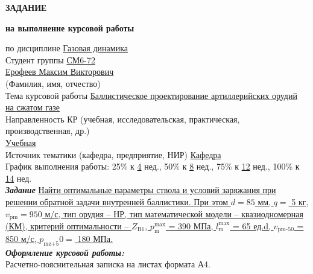 \documentclass[14pt, a4paper]{extarticle} %
\newcommand{\und}[1]{\uline{#1}}
\begin{document}
\begin{titlepage}
    \vspace{2cm}
    \textbf{ЗАДАНИЕ}

    \textbf{на выполнение курсовой работы}

    \vspace{1cm}
    \begin{flushleft}
        по дисциплине \und{Газовая динамика} \hfill \underline{\hspace{7cm}} \\[0.5cm]
        Студент группы \und{СМ6-72} \\[0.5cm]
        \underline{\hspace{12cm}} \und{Ерофеев Максим Викторович} \\
        \hspace{5cm} (Фамилия, имя, отчество) \\[0.5cm]
        Тема курсовой работы \und{Баллистическое проектирование артиллерийских орудий} \\
        \und{на сжатом газе} \\[0.5cm]
        Направленность КР (учебная, исследовательская, практическая, производственная, др.) \\
        \und{Учебная} \hfill \underline{\hspace{7cm}} \\[0.5cm]
        Источник тематики (кафедра, предприятие, НИР) \und{Кафедра} \hfill \underline{\hspace{5cm}} \\[0.5cm]
        График выполнения работы: 25\% к \und{4} нед., 50\% к \und{8} нед., 75\% к \und{12} нед., 100\% к \und{14} нед. \\[1cm]
        \textbf{\textit{Задание}} \und{Найти оптимальные параметры ствола и условий заряжания при решении обратной задачи внутренней баллистики. При этом $d = 85$ мм, $q =$ 5 кг, $ v_{\text{pm}} = 950 $ м/с, тип орудия – НР, тип математической модели – квазиодномерная (КМ), критерий оптимальности – $Z_{\text{B1}}$, $p^{\text{max}}_{\text{m}}$ = 390 МПа, $l^{\text{max}}_{\text{m}}$ = 65 ед.d, $v_{\text{pm-50}}$ = 850 м/с, $p_{\text{mz+5}}0 = $ 180 МПа.} \\[1cm]
        \textbf{\textit{Оформление курсовой работы:}} \\[0.5cm]
        Расчетно-пояснительная записка на \underline{\hspace{2cm}} листах формата А4. \\[0.5cm]
        \underline{\hspace{15cm}} \\

\end{flushleft}
\end{titlepage}
\end{document}
